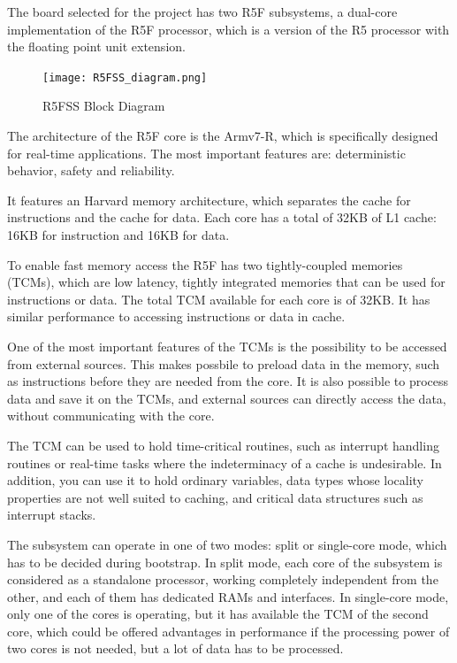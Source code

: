 The board selected for the project has two R5F subsystems, a dual-core
implementation of the R5F processor, which is a version of the R5 processor
with the floating point unit extension.

\begin{figure}[ht]
    \centering
    \texttt{[image: R5FSS\_diagram.png]}
    \caption{R5FSS Block Diagram}
\end{figure}

The architecture of the R5F core is the Armv7-R, which is specifically designed
for real-time applications.
The most important features are: deterministic behavior, safety and
reliability.

It features an Harvard memory architecture, which separates the cache for
instructions and the cache for data.
Each core has a total of 32KB of L1 cache: 16KB for instruction and 16KB for
data.

To enable fast memory access the R5F has two tightly-coupled memories (TCMs),
which are low latency, tightly integrated memories that can be used for
instructions or data. The total TCM available for each core is of 32KB.
It has similar performance to accessing instructions or data in cache.
\cite{Technical_reference_AM64}

One of the most important features of the TCMs is the possibility to be
accessed from external sources. This makes possbile to preload data in the
memory, such as instructions before they are needed from the core.
It is also possible to process data and save it on the TCMs, and external
sources can directly access the data, without communicating with the core.

The TCM can be used to hold time-critical routines, such as interrupt
handling routines or real-time tasks where the indeterminacy of a cache is
undesirable. In addition, you can use it to hold ordinary variables, data types
whose locality properties are not well suited to caching, and critical data
structures such as interrupt stacks. \cite{TCM_documentation}

The subsystem can operate in one of two modes: split or single-core mode, which
has to be decided during bootstrap.
In split mode, each core of the subsystem is considered as a standalone
processor, working completely independent from the other, and each of them has
dedicated RAMs and interfaces.
In single-core mode, only one of the cores is operating, but it has available
the TCM of the second core, which could be offered advantages in performance if
the processing power of two cores is not needed, but a lot of data has to be
processed. 

